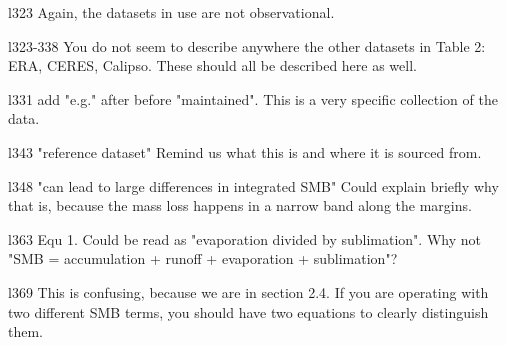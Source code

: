 \documentclass[12pt,oneside,a4paper]{article}%
\begin{document}
{\color{blue}{Done.}} \newline

l323 Again, the datasets in use are not observational. \newline

{\color{blue}{Done.}} \newline

l323-338 You do not seem to describe anywhere the other datasets in Table 2: ERA, CERES, Calipso. These should all be described here as well. \newline

{\color{blue}{Done.}} \newline

l331 add "e.g." after before "maintained". This is a very specific collection of the data. \newline

{\color{blue}{I'm not sure I follow, but I did clarify the second category to be less specific (remote sensing datasets instead of radar accumulation datasets).}} \newline

l343 "reference dataset" Remind us what this is and where it is sourced from. \newline

{\color{blue}{Clarified the reference dataset and added citation.}} \newline

l348 "can lead to large differences in integrated SMB" Could explain briefly why that is, because the mass loss happens in a narrow band along the margins. \newline

{\color{blue}{The Hansen paper indicates that differences in the ice masks occur in its representation of the ice margins, where lots of melting conceivable occurs. So an erroneously small ice mask may overestimate the SMB due to omitting areas where melting occurs. }} \newline

l363 Equ 1. Could be read as "evaporation divided by sublimation". Why not "SMB = accumulation + runoff + evaporation + sublimation"? \newline

{\color{blue}{Done.}} \newline

l369 This is confusing, because we are in section 2.4. If you are operating with two different SMB terms, you should have two equations to clearly distinguish them. \newline
\end{document}
